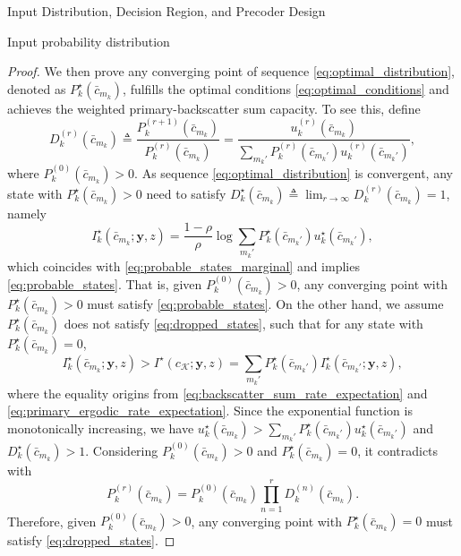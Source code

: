 \documentclass[journal]{IEEEtran}
\begin{document}
\begin{section}{Input Distribution, Decision Region, and Precoder Design}
\begin{subsection}{Input probability distribution}
\begin{proof}
				We then prove any converging point of sequence \eqref{eq:optimal_distribution}, denoted as $P_k^\star(\bar{c}_{m_k})$, fulfills the optimal conditions \eqref{eq:optimal_conditions} and achieves the weighted primary-backscatter sum capacity. To see this, define
				\begin{equation}
					D_k^{(r)}(\bar{c}_{m_k}) \triangleq \frac{P_k^{(r+1)}(\bar{c}_{m_k})}{P_k^{(r)}(\bar{c}_{m_k})} = \frac{u_k^{(r)}(\bar{c}_{m_k})}{\sum_{m_k'} P_k^{(r)}(\bar{c}_{m_k'}) u_k^{(r)}(\bar{c}_{m_k'})},
				\end{equation}
				where $P_k^{(0)}(\bar{c}_{m_k}) > 0$. As sequence \eqref{eq:optimal_distribution} is convergent, any state with $P_k^\star(\bar{c}_{m_k}) > 0$ need to satisfy $D_k^\star(\bar{c}_{m_k}) \triangleq \lim_{r \to \infty} D_k^{(r)}(\bar{c}_{m_k}) = 1$, namely
				\begin{equation}
					I_k^\star(\bar{c}_{m_k};\boldsymbol{y},z) = \frac{1 - \rho}{\rho} \log \sum_{m_k'} P_k^\star(\bar{c}_{m_k'}) u_k^\star(\bar{c}_{m_k'}),
				\end{equation}
				which coincides with \eqref{eq:probable_states_marginal} and implies \eqref{eq:probable_states}. That is, given $P_k^{(0)}(\bar{c}_{m_k}) > 0$, any converging point with $P_k^\star(\bar{c}_{m_k}) > 0$ must satisfy \eqref{eq:probable_states}.
				On the other hand, we assume $P_k^\star(\bar{c}_{m_k})$ does not satisfy \eqref{eq:dropped_states}, such that for any state with $P_k^\star(\bar{c}_{m_k}) = 0$,
				\begin{equation}
					I_k^\star(\bar{c}_{m_k};\boldsymbol{y},z) > I^\star(c_{\mathcal{K}};\boldsymbol{y},z) = \sum_{m_k'} P_k^\star(\bar{c}_{m_k'}) I_k^\star(\bar{c}_{m_k'};\boldsymbol{y},z),
				\end{equation}
				where the equality origins from \eqref{eq:backscatter_sum_rate_expectation} and \eqref{eq:primary_ergodic_rate_expectation}. Since the exponential function is monotonically increasing, we have $u_k^\star(\bar{c}_{m_k}) > \sum_{m_k'} P_k^\star(\bar{c}_{m_k'}) u_k^\star(\bar{c}_{m_k'})$ and $D_k^\star(\bar{c}_{m_k}) > 1$. Considering $P_k^{(0)}(\bar{c}_{m_k}) > 0$ and $P_k^\star(\bar{c}_{m_k}) = 0$, it contradicts with
				\begin{equation}
					P_k^{(r)}(\bar{c}_{m_k}) = P_k^{(0)}(\bar{c}_{m_k}) \prod_{n=1}^r D_k^{(n)}(\bar{c}_{m_k}).
				\end{equation}
				Therefore, given $P_k^{(0)}(\bar{c}_{m_k}) > 0$, any converging point with $P_k^\star(\bar{c}_{m_k}) = 0$ must satisfy \eqref{eq:dropped_states}.


\end{proof}
\end{subsection}
\end{section}
\end{document}
